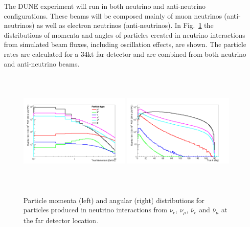 The DUNE experiment will run in both neutrino and anti-neutrino 
configurations. These beams will be composed  mainly of muon neutrinos (anti-neutrinos) as well as electron neutrinos (anti-neutrinos). In Fig.~\ref{fig:particle_momenta} the distributions of momenta and angles of particles created in neutrino interactions from 
simulated beam fluxes, including oscillation effects, are shown. The particle rates are calculated for a 34kt far detector and  are combined from both neutrino and anti-neutrino beams.
\begin{figure}[h!]
  \centering
\includegraphics[width=0.49\textwidth,height=6.0cm]{figures/True_Momenta_per_Particle_9_2_1_0_logy_logx} 
\includegraphics[width=0.49\textwidth,height=6.0cm]{figures/True_theta_per_Particle_9_2_1_0_lin}
  \caption{Particle momenta (left) and angular (right) distributions for particles produced in neutrino interactions 
from $\nu_e$, $\nu_\mu$, $\bar \nu_e$ and $\bar \nu_\mu$ at the far detector location.
}
\label{fig:particle_momenta}
\end{figure}


